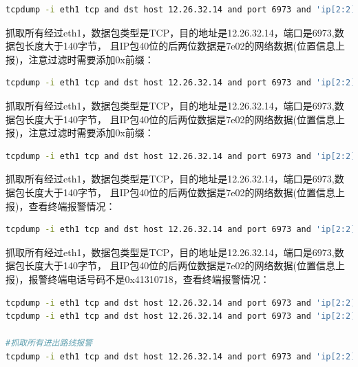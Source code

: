 \documentclass{book}
\begin{document}
\begin{lstlisting}[language=Bash]
tcpdump -i eth1 tcp and dst host 12.26.32.14 and port 6973 and 'ip[2:2]>140' -vv -X -c 100
\end{lstlisting}

抓取所有经过eth1，数据包类型是TCP，目的地址是12.26.32.14，端口是6973,数据包长度大于140字节，
且IP包40位的后两位数据是7e02的网络数据(位置信息上报)，注意过滤时需要添加0x前缀：

\begin{lstlisting}[language=Bash]
tcpdump -i eth1 tcp and dst host 12.26.32.14 and port 6973 and 'ip[2:2]>140 and ip[40,2]=0x7e02' -vv -X -c 100
\end{lstlisting}

抓取所有经过eth1，数据包类型是TCP，目的地址是12.26.32.14，端口是6973,数据包长度大于140字节，
且IP包40位的后两位数据是7e02的网络数据(位置信息上报)，注意过滤时需要添加0x前缀：

\begin{lstlisting}[language=Bash]
tcpdump -i eth1 tcp and dst host 12.26.32.14 and port 6973 and 'ip[2:2]>140 and ip[40,2]=0x7e02' -vv -X -c 100
\end{lstlisting}

抓取所有经过eth1，数据包类型是TCP，目的地址是12.26.32.14，端口是6973,数据包长度大于140字节，
且IP包40位的后两位数据是7e02的网络数据(位置信息上报)，查看终端报警情况：

\begin{lstlisting}[language=Bash]
tcpdump -i eth1 tcp and dst host 12.26.32.14 and port 6973 and 'ip[2:2]>0 and ip[41:2]=0x0200 and ip[53:4]!=0x00000000' -vv -X -c 100
\end{lstlisting}

抓取所有经过eth1，数据包类型是TCP，目的地址是12.26.32.14，端口是6973,数据包长度大于140字节，
且IP包40位的后两位数据是7e02的网络数据(位置信息上报)，报警终端电话号码不是0x41310718，查看终端报警情况：

\begin{lstlisting}[language=Bash]
tcpdump -i eth1 tcp and dst host 12.26.32.14 and port 6973 and 'ip[2:2]>0 and ip[41:2]=0x0200 and ip[53:4]!=0x00000000 and ip[46:4]!=0x41310718' -vv -X -c 100
tcpdump -i eth1 tcp and dst host 12.26.32.14 and port 6973 and 'ip[2:2]>100 and ip[41:2]=0x0200 and ip[53:4]==0x200000 and ip[46:4]!=0x41310718' -vv -X -c 10000

#抓取所有进出路线报警
tcpdump -i eth1 tcp and dst host 12.26.32.14 and port 6973 and 'ip[2:2]>0 and ip[41:2]=0x0200 and ip[53:4]==0x00100000' -vv -X -c 100
\end{lstlisting}
\end{document}
